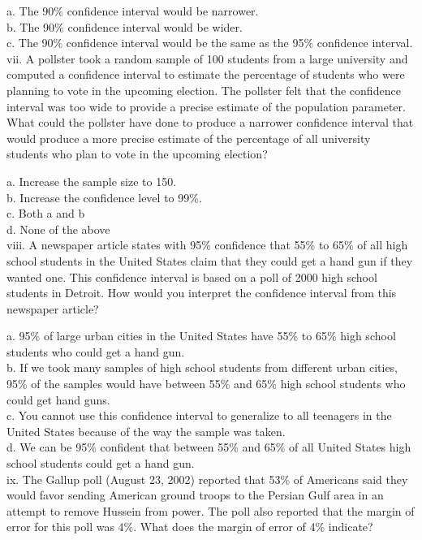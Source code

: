 \documentclass[11pt]{isuthesis}\usepackage[]{graphicx}\usepackage[]{color}
\begin{document}
\begin{appendices}
a. The 90\% confidence interval would be narrower.\\
b. The 90\% confidence interval would be wider.\\
c. The 90\% confidence interval would be the same as the 95\% confidence interval.\\


vii. A pollster took a random sample of 100 students from a large university and computed a confidence interval to estimate the percentage of students who were planning to vote in the upcoming election. The pollster felt that the confidence interval was too wide to provide a precise estimate of the population parameter. What could the pollster have done to produce a narrower confidence interval that would produce a more precise estimate of the percentage of all university students who plan to vote in the upcoming election?

a. Increase the sample size to 150.\\
b. Increase the confidence level to 99\%.\\
c. Both a and b\\
d. None of the above\\


viii. A newspaper article states with 95\% confidence that 55\% to 65\% of all high school students in the United States claim that they could get a hand gun if they wanted one. This confidence interval is based on a poll of 2000 high school students in Detroit. How would you interpret the confidence interval from this newspaper article?

a. 95\% of large urban cities in the United States have 55\% to 65\% high school students who could get a hand gun.\\
b. If we took many samples of high school students from different urban cities, 95\% of the samples would have between 55\% and 65\% high school students who could get hand guns.\\
c. You cannot use this confidence interval to generalize to all teenagers in the United States because of the way the sample was taken.\\
d. We can be 95\% confident that between 55\% and 65\% of all United States high school students could get a hand gun.\\

ix. The Gallup poll (August 23, 2002) reported that 53\% of Americans said they would favor sending American ground troops to the Persian Gulf area in an attempt to remove Hussein from power. The poll also reported that the margin of error for this poll was 4\%. What does the margin of error of 4\% indicate?


\end{appendices}
\end{document}
